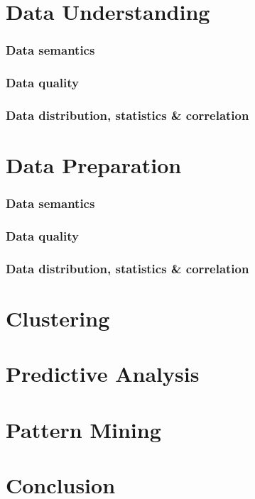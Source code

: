 \documentclass[10pt,a4paper]{report}
\begin{document}
	\clearpage
	
	
	\tableofcontents


\chapter{Data Understanding}

\subsection{Data semantics}
\subsection{Data quality}
\subsection{Data distribution, statistics \& correlation}


\chapter{Data Preparation}
\subsection{Data semantics}
\subsection{Data quality}
\subsection{Data distribution, statistics \& correlation}



\chapter{Clustering}


\chapter{Predictive Analysis}


\chapter{Pattern Mining}



\chapter{Conclusion}
\end{document}
